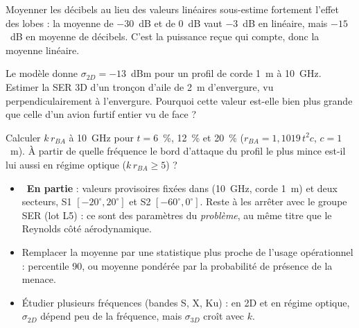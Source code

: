 \begin{piege}
Moyenner les décibels au lieu des valeurs linéaires sous-estime fortement l'effet des lobes : la moyenne de $-30$~dB et de $0$~dB vaut $-3$~dB en linéaire, mais $-15$~dB en moyenne de décibels. C'est la puissance reçue qui compte, donc la moyenne linéaire.
\end{piege}

\exercices
\begin{exercice}
Le modèle donne $\sigma_{2D}=-13$~dBm pour un profil de corde 1~m à 10~GHz. Estimer la SER 3D d'un tronçon d'aile de 2~m d'envergure, vu perpendiculairement à l'envergure. Pourquoi cette valeur est-elle bien plus grande que celle d'un avion furtif entier vu de face ?
\end{exercice}
\begin{exercice}
Calculer $k\,r_{BA}$ à 10~GHz pour $t=6$~\%, 12~\% et 20~\% ($r_{BA}=1{,}1019\,t^2c$, $c=1$~m). À partir de quelle fréquence le bord d'attaque du profil le plus mince est-il lui aussi en régime optique ($k\,r_{BA}\ge5$) ?
\end{exercice}

\begin{pistes}
\begin{itemize}
\item {}~\textbf{En partie} : valeurs provisoires fixées dans  (10~GHz, corde 1~m) et deux secteurs, S1 $[-20^\circ,20^\circ]$ et S2 $[-60^\circ,0^\circ]$. Reste à les arrêter avec le groupe SER (lot L5) : ce sont des paramètres du \emph{problème}, au même titre que le Reynolds côté aérodynamique.
\item Remplacer la moyenne par une statistique plus proche de l'usage opérationnel : percentile 90, ou moyenne pondérée par la probabilité de présence de la menace.
\item Étudier plusieurs fréquences (bandes S, X, Ku) : en 2D et en régime optique, $\sigma_{2D}$ dépend peu de la fréquence, mais $\sigma_{3D}$ croît avec $k$.
\end{itemize}
\end{pistes}
